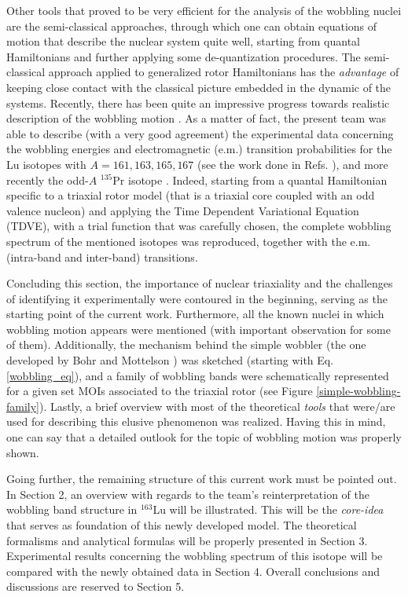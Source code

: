 \documentclass[11pt]{article}
\begin{document}
Other tools that proved to be very efficient for the analysis of the wobbling nuclei are the semi-classical approaches, through which one can obtain equations of motion that describe the nuclear system quite well, starting from quantal Hamiltonians and further applying some de-quantization procedures. The semi-classical approach applied to generalized rotor Hamiltonians has the \emph{advantage} of keeping close contact with the classical picture embedded in the dynamic of the systems. Recently, there has been quite an impressive progress towards realistic description of the wobbling motion \cite{raduta2007semiclassical,frauendorf2014transverse,raduta2017semiclassical,raduta2018wobbling,budaca2018tilted,raduta2020approach,raduta2020towards}. As a matter of fact, the present team was able to describe (with a very good agreement) the experimental data concerning the wobbling energies and electromagnetic (e.m.) transition probabilities for the Lu isotopes with $A=161,163,165,167$ (see the work done in Refs. \cite{raduta2017semiclassical,raduta2018wobbling}), and more recently the odd-$A$ $^{135}$Pr isotope \cite{raduta2020new}. Indeed, starting from a quantal Hamiltonian specific to a triaxial rotor model (that is a triaxial core coupled with an odd valence nucleon) and applying the Time Dependent Variational Equation (TDVE), with a trial function that was carefully chosen, the complete wobbling spectrum of the mentioned isotopes was reproduced, together with the e.m. (intra-band and inter-band) transitions.

Concluding this section, the importance of nuclear triaxiality and the challenges of identifying it experimentally were contoured in the beginning, serving as the starting point of the current work. Furthermore, all the known nuclei in which wobbling motion appears were mentioned (with important observation for some of them). Additionally, the mechanism behind the simple wobbler (the one developed by Bohr and Mottelson \cite{bohr1998nuclear}) was sketched (starting with Eq. \ref{wobbling_eq}), and a family of wobbling bands were schematically represented for a given set MOIs associated to the triaxial rotor (see Figure \ref{simple-wobbling-family}). Lastly, a brief overview with most of the theoretical \emph{tools} that were/are used for describing this elusive phenomenon was realized. Having this in mind, one can say that a detailed outlook for the topic of wobbling motion was properly shown.

Going further, the remaining structure of this current work must be pointed out. In Section 2, an overview with regards to the team's reinterpretation of the wobbling band structure in $^{163}$Lu will be illustrated. This will be the \emph{core-idea} that serves as foundation of this newly developed model. The theoretical formalisms and analytical formulas will be properly presented in Section 3. Experimental results concerning the wobbling spectrum of this isotope will be compared with the newly obtained data in Section 4. Overall conclusions and discussions are reserved to Section 5. 
\end{document}
